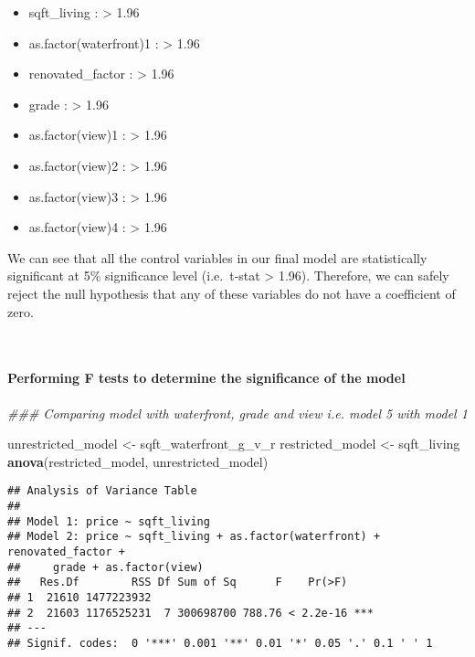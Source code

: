 \documentclass[
]{article}
\newenvironment{Shaded}{\begin{snugshade}}{\end{snugshade}}
\newcommand{\CommentTok}[1]{\textcolor[rgb]{0.56,0.35,0.01}{\textit{#1}}}
\newcommand{\KeywordTok}[1]{\textcolor[rgb]{0.13,0.29,0.53}{\textbf{#1}}}
\newcommand{\NormalTok}[1]{#1}
\newcommand{\StringTok}[1]{\textcolor[rgb]{0.31,0.60,0.02}{#1}}
\begin{document}
\begin{itemize}
\item
  sqft\_living : \textbar{} \textgreater{} 1.96
\item
  as.factor(waterfront)1 : \textbar{} \textgreater{} 1.96
\item
  renovated\_factor : \textbar{} \textgreater{} 1.96
\item
  grade : \textbar{} \textgreater{} 1.96
\item
  as.factor(view)1 : \textbar{} \textgreater{} 1.96
\item
  as.factor(view)2 : \textbar{} \textgreater{} 1.96
\item
  as.factor(view)3 : \textbar{} \textgreater{} 1.96
\item
  as.factor(view)4 : \textbar{} \textgreater{} 1.96
\end{itemize}

We can see that all the control variables in our final model are
statistically significant at 5\% significance level
(i.e.~\textbar t-stat\textbar{} \textgreater{} 1.96). Therefore, we can
safely reject the null hypothesis that any of these variables do not
have a coefficient of zero.

~

\hypertarget{performing-f-tests-to-determine-the-significance-of-the-model}{%
\paragraph{Performing F tests to determine the significance of the
model}\label{performing-f-tests-to-determine-the-significance-of-the-model}}

\begin{Shaded}
\begin{Highlighting}[]
\CommentTok{### Comparing model with waterfront, grade and view i.e. model 5 with model 1}

\NormalTok{unrestricted_model <-}\StringTok{ }\NormalTok{sqft_waterfront_g_v_r}
\NormalTok{restricted_model <-}\StringTok{ }\NormalTok{sqft_living}
\KeywordTok{anova}\NormalTok{(restricted_model, unrestricted_model)}
\end{Highlighting}
\end{Shaded}

\begin{verbatim}
## Analysis of Variance Table
## 
## Model 1: price ~ sqft_living
## Model 2: price ~ sqft_living + as.factor(waterfront) + renovated_factor + 
##     grade + as.factor(view)
##   Res.Df        RSS Df Sum of Sq      F    Pr(>F)    
## 1  21610 1477223932                                  
## 2  21603 1176525231  7 300698700 788.76 < 2.2e-16 ***
## ---
## Signif. codes:  0 '***' 0.001 '**' 0.01 '*' 0.05 '.' 0.1 ' ' 1
\end{verbatim}
\end{document}
